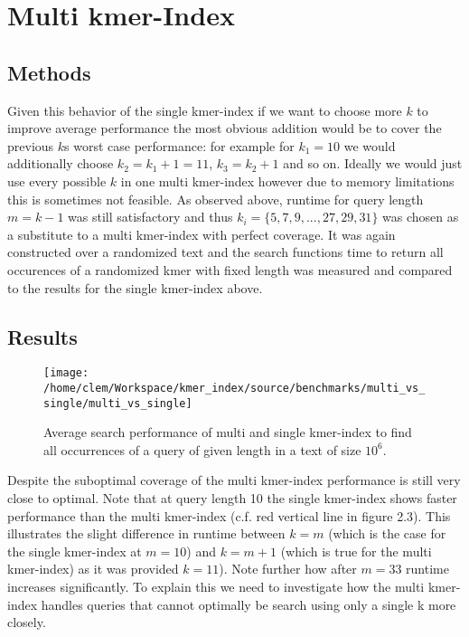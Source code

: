 \section{Multi kmer-Index}
\subsection{Methods}
Given this behavior of the single kmer-index if we want to choose more $k$ to improve average
performance the most obvious addition would be to cover the previous $k$s
worst case performance: for example for $k_{1}=10$ we would additionally
choose $k_{2}=k_{1}+1=11$, $k_{3}=k_{2}+1$ and so on. Ideally we would
just use every possible $k$ in one multi kmer-index however due to memory limitations
this is sometimes not feasible. As observed above, runtime for query length $m=k-1$
was still satisfactory and thus $k_{i}=\{5,7,9,...,27,29,31\}$ was
chosen as a substitute to a multi kmer-index with perfect coverage. It was again constructed
over a randomized text and the search functions time to return all occurences of a randomized kmer with
fixed length was measured and compared to the results for the single kmer-index above.

\subsection{Results}
\begin{figure}[H]
\texttt{[image: /home/clem/Workspace/kmer\_index/source/benchmarks/multi\_vs\_single/multi\_vs\_single]}
\label{single_vs_multi}
\caption{Average search performance of multi and single kmer-index to find
all occurrences of a query of given length in a text of size $10^{6}$.}
\end{figure}

Despite the suboptimal coverage of the multi kmer-index performance is still very close to optimal. Note that at query
length 10 the single kmer-index shows faster performance than the multi kmer-index (c.f. red vertical line in figure 2.3).
This illustrates the slight difference in runtime between $k=m$ (which is the case for the single kmer-index
at $m=10$) and $k=m+1$ (which is true for the multi kmer-index) as it was provided $k=11$).
Note further how after $m=33$ runtime increases significantly. To explain this we need to investigate how the
multi kmer-index handles queries that cannot optimally be search using only a single k more closely.

